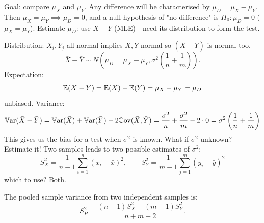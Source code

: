 \documentclass[10pt, a4paper]{article}
\begin{document}
Goal:
compare $\mu_{X}$ and $\mu_{Y}$.
Any difference will be characterised by $\mu_{D} = \mu_{X} - \mu_{Y}$.
Then $\mu_{X} = \mu_{Y} \implies \mu_{D} = 0$,
and a null hypothesis of "no difference" is $H_0 : \mu_{D} = 0$
($\mu_{X} = \mu_{Y}$).
Estimate $\mu_{D}$:
use $\bar{X} - \bar{Y}$
(MLE) -
need its distribution to form the test.

Distribution:
$X_i, Y_j$ all normal implies $\bar{X}, \bar{Y}$ normal so $(\bar{X} - \bar{Y})$ is normal too.
\begin{equation}\label{statsinfII:eq:eq8}\tag{*}
    \bar{X} - \bar{Y} \sim N\left(\mu_{D} = \mu_{X} - \mu_{Y}, \sigma ^ 2\left(\frac{1}{n} + \frac{1}{m}\right)\right).
\end{equation}
\[
\]
Expectation:
\[
\mathbb{E}(\bar{X} - \bar{Y}) = \mathbb{E}(\bar{X}) - \mathbb{E}(\bar{Y}) = \mu_{X} - \mu_{Y} = \mu_{D}
\]
unbiased.
Variance:
\[
\mathbb{V}\mathrm{ar}(\bar{X} - \bar{Y}) = \mathbb{V}\mathrm{ar}(\bar{X}) + \mathbb{V}\mathrm{ar}(\bar{Y}) - 2\mathbb{C}\mathrm{ov}(\bar{X}, \bar{Y}) = \frac{\sigma ^ 2}{n} + \frac{\sigma ^ 2}{m} - 2 \cdot 0 = \sigma ^ 2\left(\frac{1}{n} + \frac{1}{m}\right)
\]
This gives us the bias for a test when $\sigma ^ 2$ is known.
What if $\sigma ^ 2$ unknown?
Estimate it!
Two samples leads to two possible estimates of $\sigma ^ 2$:
\[
S_{X} ^ 2 = \frac{1}{n - 1}\sum_{i = 1}^{n}(x_i - \bar{x}) ^ 2,\qquad S_{Y} ^ 2 = \frac{1}{m - 1}\sum_{j = 1}^{m}(y_i - \bar{y}) ^ 2
\]
which to use?
Both.


\begin{definition}
    The pooled sample variance from two independent samples is:
    \[
    S_{P} ^ 2 = \frac{(n - 1)S_{X} ^ 2 + (m - 1)S_{Y} ^ 2}{n + m - 2}.
    \]
\end{definition}
\end{document}
